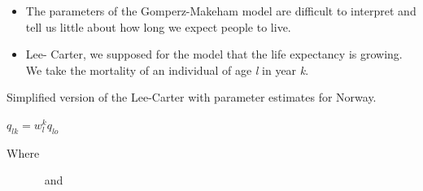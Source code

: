 \documentclass{beamer}
\begin{document}
\begin{frame}[fragile]


\begin{itemize}
\item The parameters of the Gomperz-Makeham model are difficult to interpret and tell us little about how long we expect people to live.
\item Lee- Carter, we supposed for the model that the life expectancy is
growing. We take the mortality  of an individual of age \textit{l} in year \textit{k}.
\end{itemize}



\begin{block}{Simplified version of the Lee-Carter with parameter estimates for Norway.}

\vspace{5mm}
\hspace{20mm}\scalebox{1.5} {$ q_{lk} = w_l^kq_{lo} $}

Where

\hspace{20mm}  ~~~~~~ and~~~~~~~~~~~~



\end{block}

\end{frame}
\end{document}
